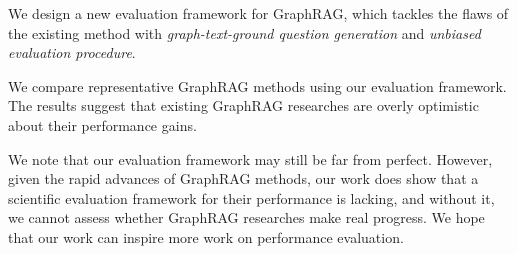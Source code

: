 \item We design a new evaluation framework for GraphRAG, which tackles the flaws of the existing method with \textit{graph-text-ground question generation} and \textit{unbiased evaluation procedure}. 

\item We compare representative GraphRAG methods using our evaluation framework. The results suggest that existing GraphRAG researches are overly optimistic about their performance gains.    

\squishend

We note that our evaluation framework may still be far from perfect. However, given the rapid advances of GraphRAG methods, our work does show that a scientific evaluation framework for their performance is lacking, and without it, we cannot assess whether GraphRAG researches make real progress. We hope that our work can inspire more work on performance evaluation.  




